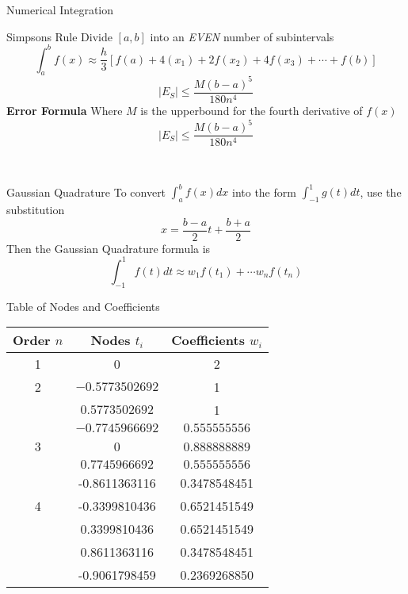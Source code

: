 \documentclass{article}
\begin{document}
\begin{multicols*}{3}
\begin{blackbox}{Numerical Integration}
{            \begin{pinkbox}{Simpsons Rule}
                Divide $[a,b]$ into an \emph{EVEN} number of subintervals\\[-2ex]
                \[\int_a^b f(x) \approx \frac{h}{3}\left[f(a) + 4(x_1) + 2f(x_2) + 4f(x_3) + \cdots + f(b)\right]\]
                \[|E_S| \leq \frac{M(b-a)^5}{180n^4}\]
                \textbf{Error Formula} Where  $M$ is the upperbound for the fourth derivative of $f(x)$\\[-2ex]
                \[|E_S| \leq \frac{M(b-a)^5}{180n^4}\]
            \end{pinkbox}\\[-2ex]
        }
    \end{blackbox}
    \begin{blackbox}{Gaussian Quadrature}
        To convert $\int_a^bf(x)dx$ into the form $\int_{-1}^1g(t)dt$, use the substitution\\[-4ex]
        \[x = \frac{b-a}{2}t + \frac{b+a}{2}\]
        Then the Gaussian Quadrature formula is\\[-2ex]
        \[\int_{-1}^{1}f(t)dt \approx w_1f(t_1) + \cdots w_nf(t_n)\]
        \begin{redbox}{Table of Nodes and Coefficients}
            \begin{center}
                \begin{tabular}{c|cc}
                    Order $n$ & Nodes $t_i$ & Coefficients $w_i$\\
                    \hline
                    1 & 0 & 2\\
                    \hline
                    2 & $-0.5773502692$ & 1\\
                    & $0.5773502692$ & 1\\
                    \hline
                    & $-0.7745966692$ & $0.555555556$\\
                    3 & 0 & 0.888888889\\
                    & $0.7745966692$ & $0.555555556$\\
                    \hline
                    & -0.8611363116 &0.3478548451\\
                    4&-0.3399810436& 0.6521451549\\
                    &0.3399810436 &0.6521451549\\
                    &0.8611363116 &0.3478548451\\
                    \hline
                    &-0.9061798459 &0.2369268850\\

\end{tabular}
\end{center}
\end{redbox}
\end{blackbox}
\end{multicols*}
\end{document}
